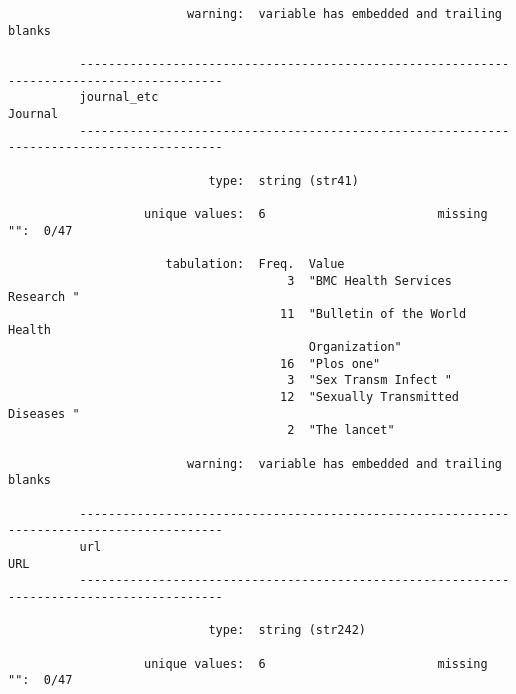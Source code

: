 \documentclass{article}
\begin{document}
\begin{verbatim}
                         warning:  variable has embedded and trailing blanks
          
          ------------------------------------------------------------------------------------------
          journal_etc                                                                        Journal
          ------------------------------------------------------------------------------------------
          
                            type:  string (str41)
          
                   unique values:  6                        missing "":  0/47
          
                      tabulation:  Freq.  Value
                                       3  "BMC Health Services Research "
                                      11  "Bulletin of the World Health
                                          Organization"
                                      16  "Plos one"
                                       3  "Sex Transm Infect "
                                      12  "Sexually Transmitted Diseases "
                                       2  "The lancet"
          
                         warning:  variable has embedded and trailing blanks
          
          ------------------------------------------------------------------------------------------
          url                                                                                    URL
          ------------------------------------------------------------------------------------------
          
                            type:  string (str242)
          
                   unique values:  6                        missing "":  0/47
          

\end{verbatim}
\end{document}
